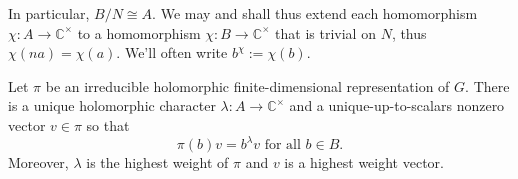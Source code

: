 \documentclass[reqno]{amsart} 
\begin{document}
In particular, $B/N \cong A$.  We may and shall thus extend each homomorphism $\chi : A \rightarrow \mathbb{C}^\times$ to a homomorphism $\chi : B \rightarrow \mathbb{C}^\times$ that is trivial on $N$, thus $\chi(n a) = \chi(a)$.  We'll often write $b^{\chi} := \chi(b)$.

\begin{theorem}\label{thm:highest-weight-borel-weil}
  Let $\pi$ be an irreducible holomorphic finite-dimensional representation of $G$.  There is a unique holomorphic character $\lambda : A \rightarrow \mathbb{C}^\times$ and a unique-up-to-scalars nonzero vector $v \in \pi$ so that
  \begin{equation}\label{eqn:v-is-a-B-eigenvector}
    \pi(b) v = b^{\lambda} v
    \text{ for all }
    b \in B.
  \end{equation}
  Moreover, $\lambda$ is the highest weight of $\pi$ and $v$ is a highest weight vector.
\end{theorem}
\end{document}
